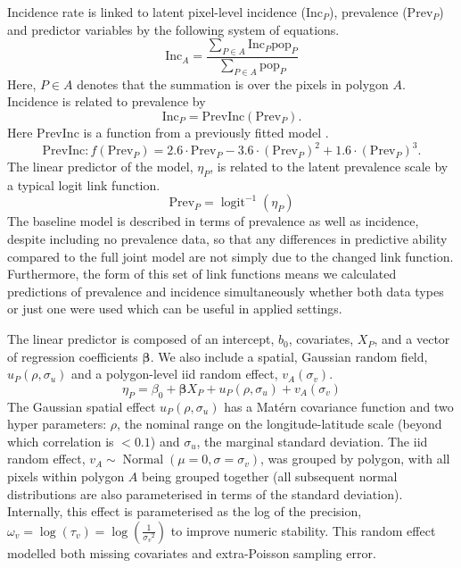 \documentclass{statsoc}
\begin{document}
Incidence rate is linked to latent pixel-level incidence ($\mathrm{Inc}_P$), prevalence ($\mathrm{Prev}_P$) and predictor variables by the following system of equations.
$$\mathrm{Inc}_A = \frac{ \sum_{P \in A}\mathrm{Inc}_P \mathrm{pop}_P}{\sum_{P \in A}\mathrm{pop}_P} $$
Here, $P \in A$ denotes that the summation is over the pixels in polygon $A$. 
Incidence is related to prevalence by
$$\mathrm{Inc}_P = \mathrm{PrevInc}(\mathrm{Prev}_P).$$
Here $\mathrm{PrevInc}$ is a function from a previously fitted model \citep{cameron2015defining}. 
$$\mathrm{PrevInc}: f\left(\mathrm{Prev}_P\right) = 2.6\cdot\mathrm{Prev}_P - 3.6\cdot{(\mathrm{Prev}_P)}^2 + 1.6\cdot{(\mathrm{Prev}_P)}^3.$$
The linear predictor of the model, $\eta_P$, is related to the latent prevalence scale by a typical logit link function.
$$\mathrm{Prev}_P = \operatorname{logit}^{-1}(\eta_P)$$
The baseline model is described in terms of prevalence as well as incidence, despite including no prevalence data, so that any differences in predictive ability compared to the full joint model are not simply due to the changed link function.
Furthermore, the form of this set of link functions means we calculated predictions of prevalence and incidence simultaneously whether both data types or just one were used which can be useful in applied settings.


The linear predictor is composed of an intercept, $b_0$, covariates, $X_P$, and a vector of regression coefficients $\boldsymbol\beta$.
We also include a spatial, Gaussian random field, $u_P(\rho, \sigma_u)$ and a polygon-level iid random effect, $ v_A(\sigma_v)$.
$$\eta_P = \beta_0 + \boldsymbol\beta X_P  + u_P(\rho, \sigma_u) + v_A(\sigma_v) $$
The Gaussian spatial effect $u_P(\rho, \sigma_u)$ has a Mat\'ern covariance function and two hyper parameters: $\rho$, the nominal range on the longitude-latitude scale (beyond which correlation is $< 0.1$) and $\sigma_u$, the marginal standard deviation.
The iid random effect, $v_A \sim \operatorname{Normal}(\mu = 0, \sigma = \sigma_v)$,  was grouped by polygon, with all pixels within polygon $A$ being grouped together (all subsequent normal distributions are also parameterised in terms of the standard deviation).
Internally, this effect is parameterised as the log of the precision, $\omega_v = \log(\tau_v) = \log(\frac{1}{{\sigma_v}^2})$ to improve numeric stability.
This random effect modelled both missing covariates and extra-Poisson sampling error.
\end{document}
